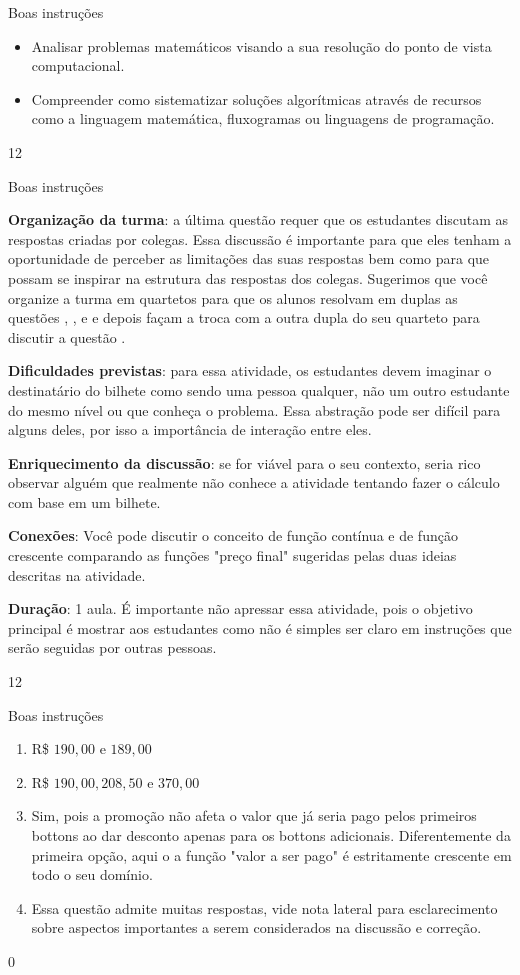 \begin{objectives}{Boas instruções}
{
\begin{itemize}
\item Analisar problemas matemáticos visando a sua resolução do ponto de vista computacional.

\item Compreender como sistematizar soluções algorítmicas através de recursos como a linguagem matemática, fluxogramas ou linguagens de programação.
\end{itemize}
}{1}{2}
\end{objectives}
\begin{sugestions}{Boas instruções}
{
\textbf{Organização da turma}: a última questão requer que os estudantes discutam as respostas criadas por colegas. Essa discussão é importante para que eles tenham a oportunidade de perceber as limitações das suas respostas bem como para que possam se inspirar na estrutura das respostas dos colegas. Sugerimos que você organize a turma em quartetos para que os alunos resolvam em duplas as questões , ,  e  e depois façam a troca com a outra dupla do seu quarteto para discutir a questão .

\textbf{Dificuldades previstas}: para essa atividade, os estudantes devem imaginar o destinatário do bilhete como sendo uma pessoa qualquer, não um outro estudante do mesmo nível ou que conheça o problema. Essa abstração pode ser difícil para alguns deles, por isso a importância de interação entre eles.

\textbf{Enriquecimento da discussão}: se for viável para o seu contexto, seria rico observar alguém que realmente não conhece a atividade tentando fazer o cálculo com base em um bilhete.

\textbf{Conexões}: Você pode discutir o conceito de função contínua e de função crescente comparando as funções "preço final"{} sugeridas pelas duas ideias descritas na atividade.

\textbf{Duração}: 1 aula. É importante não apressar essa atividade, pois o objetivo principal é mostrar aos estudantes como não é simples ser claro em instruções que serão seguidas por outras pessoas.
}{1}{2}
\end{sugestions}
\begin{answer}{Boas instruções}
{
\begin{enumerate}
\item R\$ $190{,}00\text{ e }189{,}00$

\item R\$ $190{,}00, 208,50\text{ e }370{,}00$

\item Sim, pois a promoção não afeta o valor que já seria pago pelos primeiros bottons ao dar desconto apenas para os bottons adicionais. Diferentemente da primeira opção, aqui o a função "valor a ser pago"{} é estritamente crescente em todo o seu domínio.

\item Essa questão admite muitas respostas, vide nota lateral para esclarecimento sobre aspectos importantes a serem considerados na discussão e correção.
\end{enumerate}
}{0}
\end{answer}
